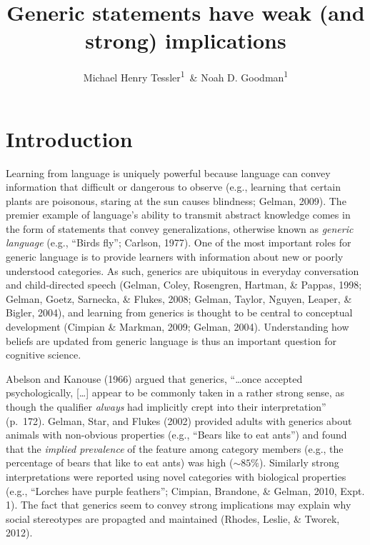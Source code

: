 \documentclass[floatsintext,doc]{apa6}
\title{Generic statements have weak (and strong) implications}
\author{Michael Henry Tessler\textsuperscript{1}~\& Noah D. Goodman\textsuperscript{1}}
\affiliation{
    \vspace{0.5cm}
          \textsuperscript{1} Department of Psychology, Stanford University  }
\theoremstyle{definition}
\theoremstyle{definition}
\theoremstyle{definition}
\theoremstyle{remark}
\begin{document}
\maketitle

\setcounter{secnumdepth}{0}



\newcommand{\denote}[1]{\mbox{ $[\![ #1 ]\!]$}}
\newcommand*\diff{\mathop{}\!\mathrm{d}}

 

\newcommand{\mht}[1]{{\textcolor{Blue}{[mht: #1]}}}
\newcommand{\ndg}[1]{{\textcolor{Green}{[ndg: #1]}}}
\newcommand{\red}[1]{{\textcolor{Red}{#1}}}







\section{Introduction}\label{introduction}

Learning from language is uniquely powerful because language can convey
information that difficult or dangerous to observe (e.g., learning that
certain plants are poisonous, staring at the sun causes blindness;
Gelman, 2009). The premier example of language's ability to transmit
abstract knowledge comes in the form of statements that convey
generalizations, otherwise known as \emph{generic language} (e.g.,
``Birds fly''; Carlson, 1977). One of the most important roles for
generic language is to provide learners with information about new or
poorly understood categories. As such, generics are ubiquitous in
everyday conversation and child-directed speech (Gelman, Coley,
Rosengren, Hartman, \& Pappas, 1998; Gelman, Goetz, Sarnecka, \& Flukes,
2008; Gelman, Taylor, Nguyen, Leaper, \& Bigler, 2004), and learning
from generics is thought to be central to conceptual development
(Cimpian \& Markman, 2009; Gelman, 2004). Understanding how beliefs are
updated from generic language is thus an important question for
cognitive science.

Abelson and Kanouse (1966) argued that generics, \enquote{\ldots{}once
accepted psychologically, {[}\ldots{}{]} appear to be commonly taken in
a rather strong sense, as though the qualifier \emph{always} had
implicitly crept into their interpretation} (p.~172). Gelman, Star, and
Flukes (2002) provided adults with generics about animals with
non-obvious properties (e.g., \enquote{Bears like to eat ants}) and
found that the \emph{implied prevalence} of the feature among category
members (e.g., the percentage of bears that like to eat ants) was high
(\(\sim 85\%\)). Similarly strong interpretations were reported using
novel categories with biological properties (e.g., ``Lorches have purple
feathers''; Cimpian, Brandone, \& Gelman, 2010, Expt. 1). The fact that
generics seem to convey strong implications may explain why social
stereotypes are propagted and maintained (Rhodes, Leslie, \& Tworek,
2012).
\end{document}
